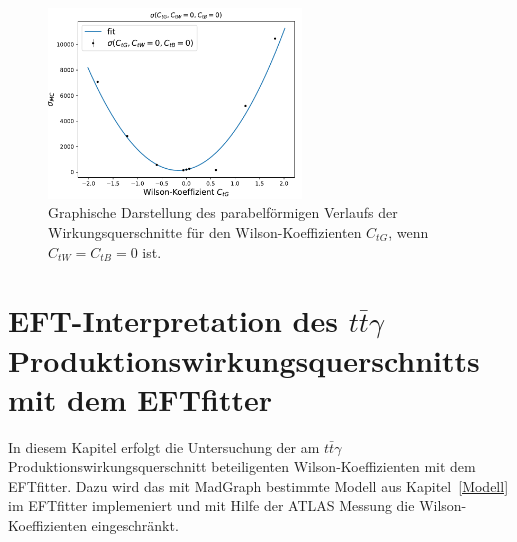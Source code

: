\begin{figure}
  \centering
  \includegraphics[width=0.6\textwidth]{Plots/combi_plot_tG.pdf}
  \caption{Graphische Darstellung des parabelförmigen Verlaufs der Wirkungsquerschnitte für den Wilson-Koeffizienten $C_{tG}$, wenn $C_{tW}=C_{tB}=0$ ist.}
  \label{fig:WtG}
\end{figure}
%
%
\chapter{EFT-Interpretation des \texorpdfstring {$t\bar{t}\gamma$}{math} Produktionswirkungsquerschnitts mit dem EFTfitter}
In diesem Kapitel erfolgt die Untersuchung der am $t\bar{t}\gamma$ Produktionswirkungsquerschnitt beteiligenten Wilson-Koeffizienten mit dem EFTfitter. Dazu wird das mit MadGraph bestimmte Modell aus Kapitel~\ref{Modell} im EFTfitter implemeniert und mit Hilfe der ATLAS Messung die Wilson-Koeffizienten eingeschränkt.

